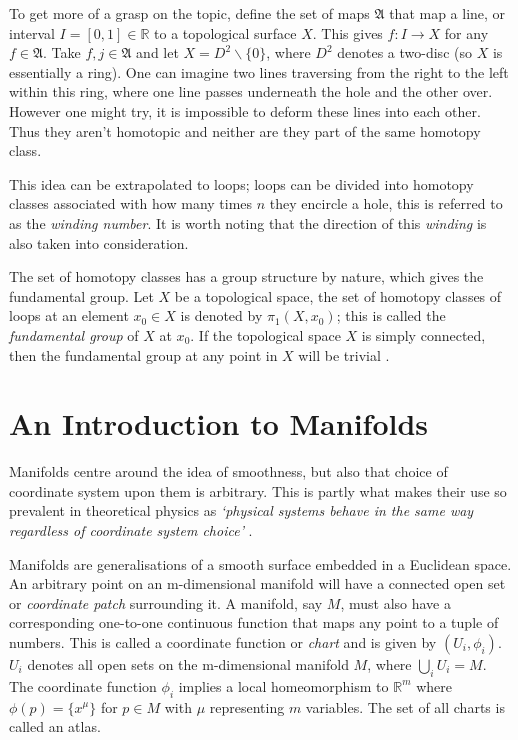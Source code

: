 \documentclass[fleqn, twocolumn, 10pt]{article}
\begin{document}
To get more of a grasp on the topic, define the set of maps $\mathfrak{A}$ that map a line, or interval $I = [0,1] \in \mathbb{R}$ to a topological surface $X$. This gives $f: I \to X$ for any $f \in \mathfrak{A}$. Take $f,j \in \mathfrak{A}$ and let $X = D^2\backslash\{0\}$, where $D^2$ denotes a two-disc (so $X$ is essentially a ring). One can imagine two lines traversing from the right to the left within this ring, where one line passes underneath the hole and the other over. However one might try, it is impossible to deform these lines into each other. Thus they aren't homotopic and neither are they part of the same homotopy class.

This idea can be extrapolated to loops; loops can be divided into homotopy classes associated with how many times $n$ they encircle a hole, this is referred to as the \textit{winding number}. It is worth noting that the direction of this \textit{winding} is also taken into consideration.

The set of homotopy classes has a group structure by nature, which gives the fundamental group. Let $X$ be a topological space, the set of homotopy classes of loops at an element $x_0 \in X$ is denoted by $\pi_1(X,x_0)$; this is called the \textit{fundamental group} of $X$ at $x_0$. If the topological space $X$ is simply connected, then the fundamental group at any point in $X$ will be trivial \cite{nakahara2003geometry, sharp2019topology, zirnbauer2013topology, kobayashi1963foundations}. 


\section{An Introduction to Manifolds}
Manifolds centre around the idea of smoothness, but also that choice of coordinate system upon them is arbitrary. This is partly what makes their use so prevalent in theoretical physics as \textit{`physical systems behave in the same way regardless of coordinate system choice'} \cite{nakahara2003geometry}.

Manifolds are generalisations of a smooth surface embedded in a Euclidean space. An arbitrary point on an m-dimensional manifold will have a connected open set or \textit{coordinate patch} surrounding it. A manifold, say $M$, must also have a corresponding one-to-one continuous function that maps any point to a tuple of numbers. This is called a coordinate function or \textit{chart} and is given by $(U_i,\phi_i)$. $U_i$ denotes all open sets on the m-dimensional manifold $M$, where $\bigcup_i U_i = M$. The coordinate function $\phi_i$ implies a local homeomorphism to $\mathbb{R}^m$ where $\phi (p) = \{x^\mu \}$ for $p \in M$ with $\mu$ representing $m$ variables.  The set of all charts is called an atlas.
\end{document}
